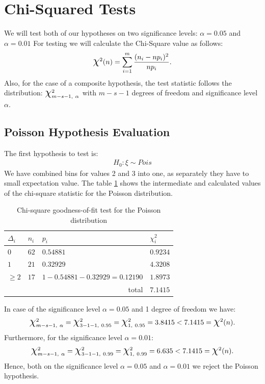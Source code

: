 \documentclass[final,3p,times,onecolumn]{elsarticle}
\begin{document}
\section{Chi-Squared Tests}
We will test both of our hypotheses on two significance levels: $\alpha = 0.05$ and $\alpha = 0.01$
For testing we will calculate the Chi-Square value as follows:
\begin{gather}
\label{eq:chi2}
\scalebox{1.5}{$\chi$}^2(n) = \sum\limits_{i = 1}^m \dfrac{(n_i - np_i)^2}{np_i}.
\end{gather}
Also, for the case of a composite hypothesis, the test statistic follows the distribution: 
$\scalebox{1.5}{$\chi$}^2_{m - s - 1, \ \alpha}$ with $m - s - 1$ degrees of freedom and significance level $\alpha$.

\subsection{Poisson Hypothesis Evaluation}
The first hypothesis to test is:
\begin{gather*}
H_0: \xi \sim Pois
\end{gather*}
We have combined bins for values 2 and 3 into one, as separately they have 
to small expectation value. The table \ref{tab:chi_poisson} 
shows the intermediate and calculated values of the chi-square statistic for the Poisson distribution.
\begin{table}[ht!]
\centering
\setlength{\tabcolsep}{10pt}
\renewcommand{\arraystretch}{1.25}
\caption{Chi-square goodness-of-fit test for the Poisson distribution}
\label{tab:chi_poisson}
\begin{tabular}{llll}
\toprule
$\Delta_i$ & $n_i$ & $p_i$ & $\chi^2_i$ \\
\midrule
$0$ 
& $62$ 
& $0.54881$ 
& $0.9234$ \\

$1$ 
& $21$ 
& $0.32929$ 
& $4.3208$ \\

$\geq 2$ 
& $17$ 
& $1 - 0.54881 - 0.32929 = 0.12190$ 
& $1.8973$ \\

\midrule
\multicolumn{3}{r}{total} & $7.1415$ \\
\bottomrule
\end{tabular}
\end{table}
In case of the significance level $\alpha = 0.05$ and 1 degree of freedom we have:
\begin{gather*}
\scalebox{1.5}{$\chi$}^2_{m - s - 1, \ \alpha} = \scalebox{1.5}{$\chi$}^2_{3 - 1 - 1, \ 0.95} = \scalebox{1.5}{$\chi$}^2_{1, \ 0.95} =  3.8415 < 7.1415 = \scalebox{1.5}{$\chi$}^2(n).
\end{gather*}
Furthermore, for the significance level $\alpha = 0.01$: 
\begin{gather*}
\scalebox{1.5}{$\chi$}^2_{m - s - 1, \ \alpha} = \scalebox{1.5}{$\chi$}^2_{3 - 1 - 1, \ 0.99} = \scalebox{1.5}{$\chi$}^2_{1, \ 0.99} =  6.635 < 7.1415 = \scalebox{1.5}{$\chi$}^2(n).
\end{gather*}
Hence, both on the significance level $\alpha = 0.05$ and  $\alpha = 0.01$ we reject the Poisson hypothesis.
\end{document}
